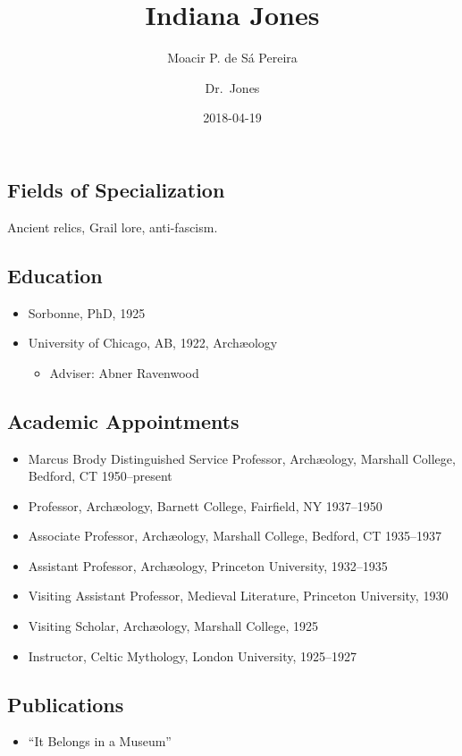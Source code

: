 \documentclass[]{article}
\title{Indiana Jones}
\author{Moacir P. de Sá Pereira\and Dr.~Jones}
\date{2018-04-19}
\def\tightlist{} %
\begin{document}
  \maketitle

\hypertarget{fields-of-specialization}{%
\subsection{Fields of Specialization}\label{fields-of-specialization}}

Ancient relics, Grail lore, anti-fascism.

\hypertarget{education}{%
\subsection{Education}\label{education}}

\begin{itemize}
\tightlist
\item
  Sorbonne, PhD, 1925
\item
  University of Chicago, AB, 1922, Archæology

  \begin{itemize}
  \tightlist
  \item
    Adviser: Abner Ravenwood
  \end{itemize}
\end{itemize}

\hypertarget{academic-appointments}{%
\subsection{Academic Appointments}\label{academic-appointments}}

\begin{itemize}
\tightlist
\item
  Marcus Brody Distinguished Service Professor, Archæology, Marshall
  College, Bedford, CT 1950--present
\item
  Professor, Archæology, Barnett College, Fairfield, NY 1937--1950
\item
  Associate Professor, Archæology, Marshall College, Bedford, CT
  1935--1937
\item
  Assistant Professor, Archæology, Princeton University, 1932--1935
\item
  Visiting Assistant Professor, Medieval Literature, Princeton
  University, 1930
\item
  Visiting Scholar, Archæology, Marshall College, 1925
\item
  Instructor, Celtic Mythology, London University, 1925--1927
\end{itemize}

\hypertarget{publications}{%
\subsection{Publications}\label{publications}}

\begin{itemize}
\tightlist
\item
  ``It Belongs in a Museum''
\end{itemize}
\end{document}

